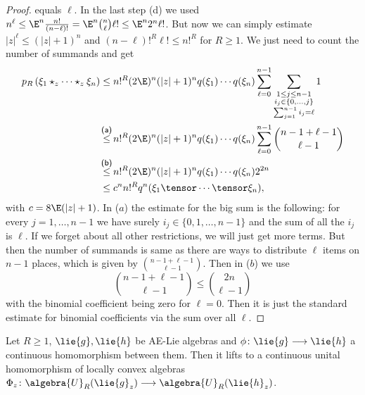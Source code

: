 \begin{proof}
    equals $\ell$. In the last step (d) we used $n^{\ell} \leq \E^n
    \frac{n!}{(n-\ell)!} = \E^n \binom{n} {\ell} \ell! \leq \E^n 2^n
    \ell!$. But now we can simply estimate $|z|^{\ell} \leq (|z| +
    1)^n$ and $(n - \ell)!^R \ell! \leq n!^R$ for $R \geq 1$. We just
    need to count the number of summands and get
    \begin{align*}
        p_R \left(
            \xi_1 \star_z \cdots \star_z \xi_n
        \right)
        & \leq
        n!^R (2 \E)^n (|z| + 1)^n
        q(\xi_1) \cdots q(\xi_n)
        \sum\limits_{\ell = 0}^{n-1}
        \sum\limits_{\substack{
			1 \leq j \leq n-1 \\
			i_j \in \{0, \ldots, j\} \\
			\sum_{j = 1}^{n - 1} i_j = \ell
		}}
		1
        \\
        &\ot{(a)}{\leq}
        n!^R (2 \E)^n (|z| + 1)^n
        q(\xi_1) \cdots q(\xi_n)
        \sum\limits_{\ell = 0}^{n-1}
        \binom{n - 1 + \ell - 1}{\ell - 1}
        \\
        &\ot{(b)}{\leq}
        n!^R (2 \E)^n (|z| + 1)^n
        q(\xi_1) \cdots q(\xi_n)
        2^{2n}
        \\
        &\leq
        c^n n!^R q^n(\xi_1 \tensor \cdots \tensor \xi_n),
    \end{align*}
    with $c = 8 \E (|z| + 1)$. In ($a$) the estimate for the big sum
    is the following: for every $j = 1, \ldots, n-1$ we have surely
    $i_j \in \{0, 1, \ldots, n-1\}$ and the sum of all the $i_j$ is
    $\ell$. If we forget about all other restrictions, we will just get
    more terms. But then the number of summands is same as there
    are ways to distribute $\ell$ items on $n-1$ places, which is
    given by $\binom{n - 1 + \ell - 1}{\ell - 1}$. Then in ($b$) we
    use
    \begin{equation*}
        \binom{n - 1 + \ell - 1}{\ell - 1} \leq \binom{2 n}{\ell - 1}
    \end{equation*}
    with the binomial coefficient being zero for $\ell = 0$. Then it
    is just the standard estimate for binomial coefficients via the
    sum over all $\ell$.
\end{proof}
\begin{proposition}[Functoriality]
	\label{LCAna:Prop:Functoriality}
	Let $R \geq 1$, $\lie{g}, \lie{h}$ be AE-Lie algebras and $\phi \colon
	\lie{g} \longrightarrow \lie{h}$ a continuous homomorphism between them.
	Then it lifts to a continuous unital homomorphism of locally convex
	algebras $\Phi_z \colon \algebra{U}_R(\lie{g}_z) \longrightarrow
	\algebra{U}_R(\lie{h}_z)$.
\end{proposition}
